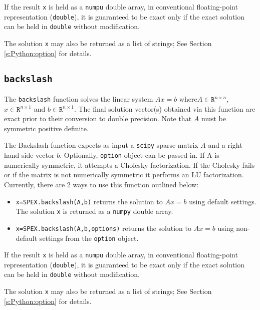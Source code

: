 \documentclass[12pt,oneside]{book}
\theoremstyle{definition}
\begin{document}
If the result \verb|x| is held as a \verb|numpu| double array, in conventional floating-point representation (\verb|double|), it is guaranteed to be exact only if the exact solution can be held in \verb|double| without modification.

The solution \verb|x| may also be returned as a list of strings; See Section \ref{s:Python:option} for details.


\subsection{\texttt{backslash}}
The \verb|backslash| function solves the linear system $Ax=b$ where$A \in \mathtt{R}^{n \times n}$, $x \in \mathtt{R}^{n \times 1}$ and $b \in \mathtt{R}^{n \times 1}$. The final solution vector(s) obtained via this function are exact prior to their conversion to double precision. Note that $A$ must be symmetric positive definite.

The Backslash function expects as input a \verb|scipy| sparse matrix $A$ and a right hand side vector $b$. Optionally, \verb|option| object can be passed in. If A is numerically symmetric, it attempts a Cholesky factorization. If the Cholesky fails or if the matrix is not numerically symmetric it performs an LU factorization.
Currently, there are 2 ways to use this function outlined below:

\begin{itemize}
    \item \verb|x=SPEX.backslash(A,b)| returns the solution to $A x = b$ using default settings. The solution \verb|x| is returned as a \verb|numpy| double array.
    \item \verb|x=SPEX.backslash(A,b,options)| returns the solution to $A x = b$ using non-default settings from the \verb|option| object.
\end{itemize}

If the result \verb|x| is held as a \verb|numpu| double array, in conventional floating-point representation (\verb|double|), it is guaranteed to be exact only if the exact solution can be held in \verb|double| without modification.

The solution \verb|x| may also be returned as a list of strings; See Section \ref{s:Python:option} for details.


\end{document}
